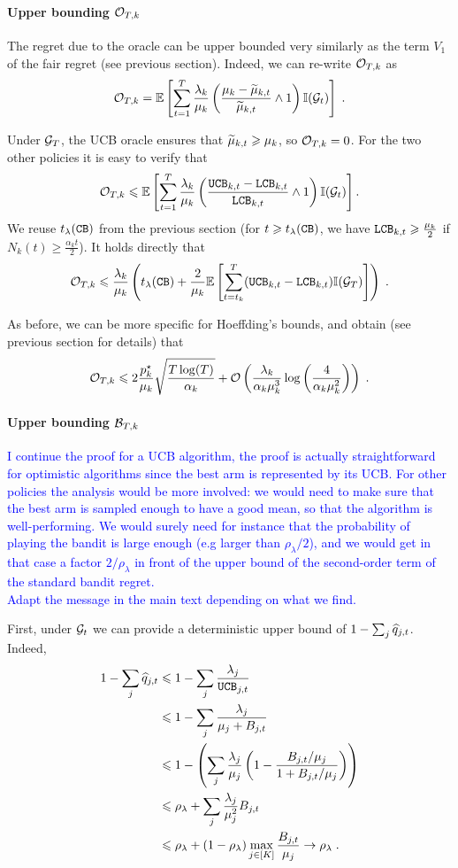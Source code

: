 \paragraph{Upper bounding $\mathcal{O}_{T, k}$} The regret due to the oracle can be upper bounded very similarly as the term $V_1$ of the fair regret (see previous section). Indeed, we can re-write $\mathcal{O}_{T,k}$ as 
\[\mathcal{O}_{T,k} =\mathbb{E}\left[\sum_{t=1}^T \frac{\lambda_k}{\mu_k}\left(\frac{\mu_k-\widetilde{\mu}_{k, t}}{\widetilde{\mu}_{k, t}} \wedge 1 \right) \mathbb{I}(\mathcal{G}_t)\right] \;.  \]

Under $\mathcal{G}_T$, the UCB oracle ensures that $\widetilde{\mu}_{k, t}\geqslant \mu_k$, so $\mathcal{O}_{T,k}=0$. For the two other policies it is easy to verify that 
\[ \mathcal{O}_{T,k} \leqslant \mathbb{E}\left[\sum_{t=1}^T \frac{\lambda_k}{\mu_k}\left(\frac{\texttt{UCB}_{k, t}- \texttt{LCB}_{k, t}}{\texttt{LCB}_{k, t}}\wedge 1\right) \mathbb{I}(\mathcal{G}_t)\right].\]
We reuse $t_\lambda(\texttt{CB})$ from the previous section (for $t\geqslant t_\lambda(\texttt{CB})$, we have $\texttt{LCB}_{k,t}\geqslant \frac{\mu_k}{2}$ if $N_k(t)\geq \frac{\alpha_k t}{2}$). It holds directly that 
\[\mathcal{O}_{T,k} \leqslant \frac{\lambda_k}{\mu_k} \left(t_\lambda(\texttt{CB}) + \frac{2}{\mu_k}\mathbb{E}\left[\sum_{t=t_k}^T (\texttt{UCB}_{k, t}- \texttt{LCB}_{k, t}) \mathbb{I}(\mathcal{G}_T)\right] \right) \;. \]

As before, we can be more specific for Hoeffding's bounds, and obtain (see previous section for details) that
\[ \mathcal{O}_{T,k} \leqslant 2\frac{p_k^\star}{\mu_k}\sqrt{\frac{T\log(T)}{\alpha_k}} + \mathcal{O}\left(\frac{\lambda_k}{\alpha_k \mu_k^3}\log\left(\frac{4}{\alpha_k \mu_k^2}\right)\right)  \;. \]

\paragraph{Upper bounding $\mathcal{B}_{T, k}$} \textcolor{blue}{I continue the proof for a UCB algorithm, the proof is actually straightforward for optimistic algorithms since the best arm is represented by its UCB. For other policies the analysis would be more involved: we would need to make sure that the best arm is sampled enough to have a good mean, so that the algorithm is well-performing. We would surely need for instance that the probability of playing the bandit is large enough (e.g larger than $\rho_\lambda/2$), and we would get in that case a factor $2/\rho_\lambda$ in front of the upper bound of the second-order term of the standard bandit regret.\\
Adapt the message in the main text depending on what we find.}

First, under $\mathcal{G}_t$ we can provide a deterministic upper bound of $1-\sum_j \widehat{q}_{j,t} $. Indeed,
\begin{align*}
1-\sum_j \widehat{q}_{j,t} & \leqslant 1 - \sum_j \frac{\lambda_j}{\texttt{UCB}_{j,t}} \\
& \leqslant 1- \sum_j \frac{\lambda_j}{\mu_j + B_{j,t}} \\
& \leqslant 1- \left(\sum_j \frac{\lambda_j}{\mu_j}\left(1- \frac{B_{j, t}/\mu_j}{1+B_{j,t}/\mu_j}\right) \right) \\
& \leqslant \rho_\lambda + \sum_j \frac{\lambda_j}{\mu_j^2} B_{j,t}\\
&\leqslant \rho_\lambda + (1-\rho_\lambda)\max_{j \in[K]} \frac{B_{j,t}}{\mu_j} \to \rho_\lambda \;.
\end{align*}

